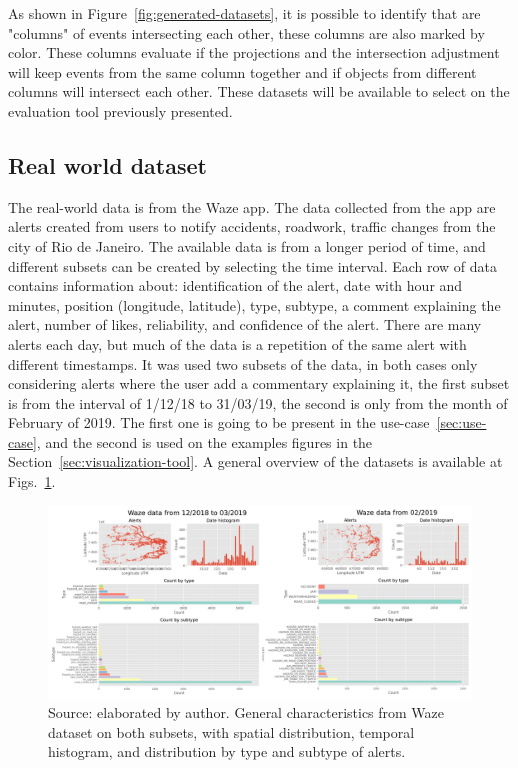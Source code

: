 As shown in Figure~\ref{fig:generated-datasets}, it is possible to identify that are "columns" of events intersecting each other, these columns are also marked by color. 
%
These columns evaluate if the projections and the intersection adjustment will keep events from the same column together and if objects from different columns will intersect each other.
%
These datasets will be available to select on the evaluation tool previously presented.

\subsection{Real world dataset}

The real-world data is from the Waze app.
%
The data collected from the app are alerts created from users to notify accidents, roadwork, traffic changes from the city of Rio de Janeiro.
%
The available data is from a longer period of time, and different subsets can be created by selecting the time interval.
%
Each row of data contains information about: identification of the alert, date with hour and minutes, position (longitude, latitude), type, subtype, a comment explaining the alert, number of likes, reliability, and confidence of the alert.
%
There are many alerts each day, but much of the data is a repetition of the same alert with different timestamps. 
%
It was used two subsets of the data, in both cases only considering alerts where the user add a commentary explaining it, the first subset is from the interval of 1/12/18 to 31/03/19, the second is only from the month of February of 2019.
%
The first one is going to be present in the use-case~\ref{sec:use-case}, and the second is used on the examples figures in the Section~\ref{sec:visualization-tool}.
%
A general overview of the datasets is available at Figs.~\ref{fig:waze-overview}.

\begin{figure}
    \centering
    \includegraphics[width = \textwidth]{src/imgs/waze-datasets.pdf}
    \caption{Source: elaborated by author. General characteristics from Waze dataset on both subsets, with spatial distribution, temporal histogram, and distribution by type and subtype of alerts.}
    \label{fig:waze-overview}
\end{figure}


